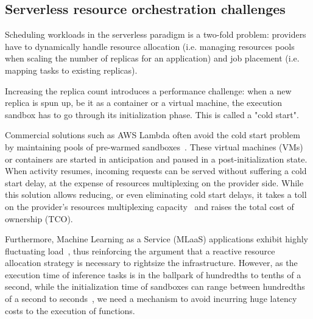 \subsection{Serverless resource orchestration challenges}

Scheduling workloads in the serverless paradigm is a two-fold problem: providers have to dynamically handle resource allocation (i.e. managing resources pools when scaling the number of replicas for an application) and job placement (i.e. mapping tasks to existing replicas).

Increasing the replica count introduces a performance challenge: when a new replica is spun up, be it as a container or a virtual machine, the execution sandbox has to go through its initialization phase. This is called a "cold start".

Commercial solutions such as AWS Lambda often avoid the cold start problem by maintaining pools of pre-warmed sandboxes~\cite{vahidiniaColdStartServerless2020}. These virtual machines (VMs) or containers are started in anticipation and paused in a post-initialization state. When activity resumes, incoming requests can be served without suffering a cold start delay, at the expense of resources multiplexing on the provider side. While this solution allows reducing, or even eliminating cold start delays, it takes a toll on the provider's resources multiplexing capacity~\cite{hellersteinServerlessComputingOne2019} and raises the total cost of ownership (TCO).



Furthermore, Machine Learning as a Service (MLaaS) applications exhibit highly fluctuating load~\cite{gujaratiSwayamDistributedAutoscaling2017}, thus reinforcing the argument that a reactive resource allocation strategy is necessary to rightsize the infrastructure. However, as the execution time of inference tasks is in the ballpark of hundredths to tenths of a second, while the initialization time of sandboxes can range between hundredths of a second to seconds~\cite{mancoMyVMLighter2017}, we need a mechanism to avoid incurring huge latency costs to the execution of functions.

